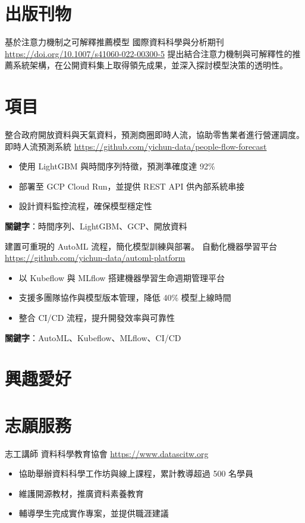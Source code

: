 \documentclass[a4paper, serif, 10pt]{moderncv}
\begin{document}
\section{出版刊物}

        {基於注意力機制之可解釋推薦模型}
        {國際資料科學與分析期刊}
        {\url{https://doi.org/10.1007/s41060-022-00300-5}}
        {}
        {提出結合注意力機制與可解釋性的推薦系統架構，在公開資料集上取得領先成果，並深入探討模型決策的透明性。}
\section{項目}

        {整合政府開放資料與天氣資料，預測商圈即時人流，協助零售業者進行營運調度。}
        {即時人流預測系統}
        {\url{https://github.com/yichun-data/people-flow-forecast}}
        {}
        {\begin{itemize}
\item 使用 LightGBM 與時間序列特徵，預測準確度達 92\%
\item 部署至 GCP Cloud Run，並提供 REST API 供內部系統串接
\item 設計資料監控流程，確保模型穩定性
\end{itemize}
\textbf{關鍵字}：時間序列、LightGBM、GCP、開放資料}

        {建置可重現的 AutoML 流程，簡化模型訓練與部署。}
        {自動化機器學習平台}
        {\url{https://github.com/yichun-data/automl-platform}}
        {}
        {\begin{itemize}
\item 以 Kubeflow 與 MLflow 搭建機器學習生命週期管理平台
\item 支援多團隊協作與模型版本管理，降低 40\% 模型上線時間
\item 整合 CI/CD 流程，提升開發效率與可靠性
\end{itemize}
\textbf{關鍵字}：AutoML、Kubeflow、MLflow、CI/CD}
\section{興趣愛好}

\section{志願服務}

        {志工講師}
        {資料科學教育協會}
        {\url{https://www.datascitw.org}}
        {}
        {\begin{itemize}
\item 協助舉辦資料科學工作坊與線上課程，累計教導超過 500 名學員
\item 維護開源教材，推廣資料素養教育
\item 輔導學生完成實作專案，並提供職涯建議
\end{itemize}}
    
\end{document}
